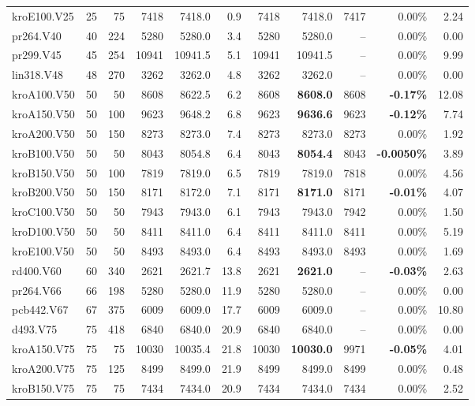 {\begin{longtable}{llr rrr rrr r r}
kroE100.V25 & 25 & 75 & 7418 & 7418.0 & 0.9 & 7418 & 7418.0 & 7417 & 0.00\% & 2.24 \\
pr264.V40 & 40 & 224 & 5280 & 5280.0 & 3.4 & 5280 & 5280.0 & -- & 0.00\% & 0.00 \\
pr299.V45 & 45 & 254 & 10941 & 10941.5 & 5.1 & 10941 & 10941.5 & -- & 0.00\% & 9.99 \\
lin318.V48 & 48 & 270 & 3262 & 3262.0 & 4.8 & 3262 & 3262.0 & -- & 0.00\% & 0.00 \\
kroA100.V50 & 50 & 50 & 8608 & 8622.5 & 6.2 & 8608 & \textbf{8608.0} & 8608 & \textbf{-0.17\%} & 12.08 \\
kroA150.V50 & 50 & 100 & 9623 & 9648.2 & 6.8 & 9623 & \textbf{9636.6} & 9623 & \textbf{-0.12\%} & 7.74 \\
kroA200.V50 & 50 & 150 & 8273 & 8273.0 & 7.4 & 8273 & 8273.0 & 8273 & 0.00\% & 1.92 \\
kroB100.V50 & 50 & 50 & 8043 & 8054.8 & 6.4 & 8043 & \textbf{8054.4} & 8043 & \textbf{-0.0050\%} & 3.89 \\
kroB150.V50 & 50 & 100 & 7819 & 7819.0 & 6.5 & 7819 & 7819.0 & 7818 & 0.00\% & 4.56 \\
kroB200.V50 & 50 & 150 & 8171 & 8172.0 & 7.1 & 8171 & \textbf{8171.0} & 8171 & \textbf{-0.01\%} & 4.07 \\
kroC100.V50 & 50 & 50 & 7943 & 7943.0 & 6.1 & 7943 & 7943.0 & 7942 & 0.00\% & 1.50 \\
kroD100.V50 & 50 & 50 & 8411 & 8411.0 & 6.4 & 8411 & 8411.0 & 8411 & 0.00\% & 5.19 \\
kroE100.V50 & 50 & 50 & 8493 & 8493.0 & 6.4 & 8493 & 8493.0 & 8493 & 0.00\% & 1.69 \\
rd400.V60 & 60 & 340 & 2621 & 2621.7 & 13.8 & 2621 & \textbf{2621.0} & -- & \textbf{-0.03\%} & 2.63 \\
pr264.V66 & 66 & 198 & 5280 & 5280.0 & 11.9 & 5280 & 5280.0 & -- & 0.00\% & 0.00 \\
pcb442.V67 & 67 & 375 & 6009 & 6009.0 & 17.7 & 6009 & 6009.0 & -- & 0.00\% & 10.80 \\
d493.V75 & 75 & 418 & 6840 & 6840.0 & 20.9 & 6840 & 6840.0 & -- & 0.00\% & 0.00 \\
kroA150.V75 & 75 & 75 & 10030 & 10035.4 & 21.8 & 10030 & \textbf{10030.0} & 9971 & \textbf{-0.05\%} & 4.01 \\
kroA200.V75 & 75 & 125 & 8499 & 8499.0 & 21.9 & 8499 & 8499.0 & 8499 & 0.00\% & 0.48 \\
kroB150.V75 & 75 & 75 & 7434 & 7434.0 & 20.9 & 7434 & 7434.0 & 7434 & 0.00\% & 2.52 \\

\end{longtable}}
